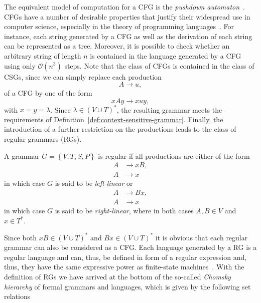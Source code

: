 The equivalent model of computation for a CFG is the \emph{pushdown automaton}~\cite{linz2006introduction}.  
CFGs have a number of desirable properties that justify their widespread use in computer science, especially in the theory of programming languages~\cite{pierce2002types}.
For instance, each string generated by a CFG as well as the derivation of each string can be represented as a tree.
Moreover, it is possible to check whether an arbitrary string of length $n$ is contained in the language generated by a CFG using only $\mathcal{O}(n^3)$ steps.
Note that the class of CFGs is contained in the class of CSGs, since we can simply replace each production 
\begin{equation}
	A \to u,
\end{equation}
of a CFG by one of the form
\begin{equation}
	xAy \to xuy,
\end{equation}
with $x = y = \lambda$. 
Since $\lambda \in \left(V \cup T\right)^*$, the resulting grammar meets the requirements of Definition~\ref{def:context-sensitive-grammar}.
Finally, the introduction of a further restriction on the productions leads to the class of regular grammars (RGs).
\begin{definition}
	A grammar $G = \left\{V, T, S, P\right\}$ is regular if all productions are either of the form
	\begin{equation*}
		\begin{split}
			A & \to xB, \\
			A & \to x
		\end{split}
	\end{equation*}
in which case $G$ is said to be \emph{left-linear} or 
	\begin{equation*}
	\begin{split}
		A & \to Bx, \\
		A & \to x
	\end{split}
	\end{equation*}
in which case $G$ is said to be \emph{right-linear}, where in both cases $A, B \in V$ and $x \in T^*$.
\end{definition}
Since both $xB \in \left(V \cup T\right)^*$ and $Bx \in \left(V \cup T\right)^*$ it is obvious that each regular grammar can also be considered as a CFG.
Each language generated by a RG is a regular language and can, thus, be defined in form of a regular expression and, thus, they have the same expressive power as finite-state machines~\cite{linz2006introduction}.
With the definition of RGs we have arrived at the bottom of the so-called \emph{Chomsky hierarchy} of formal grammars and languages, which is given by the following set relations
